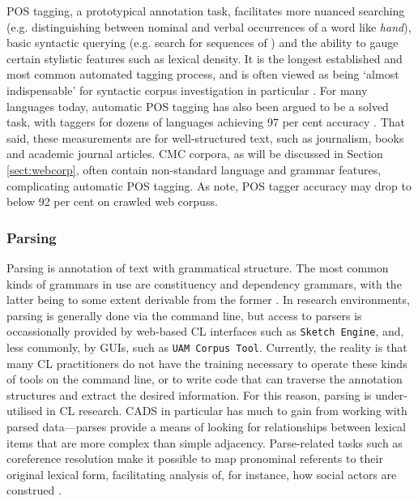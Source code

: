 \gls{POS} tagging, a prototypical annotation task, facilitates more nuanced searching (e.g. distinguishing between nominal and verbal occurrences of a word like \emph{hand}), basic syntactic querying (e.g. search for sequences of ) and the ability to gauge certain stylistic features such as lexical density. It is the longest established and most common automated tagging process, and is often viewed as being `almost indispensable' for syntactic \gls{corpus} investigation in particular \cite[p.~23]{giesbrecht_is_2009}. For many languages today, automatic \gls{POS} tagging has also been argued to be a solved task, with taggers for dozens of languages achieving 97 per cent accuracy \cite{giesbrecht_is_2009}. That said, these measurements are for well\hyp{}structured text, such as journalism, books and academic journal articles. \gls{CMC} corpora, as will be discussed in Section \ref{sect:webcorp}, often contain non-standard language and grammar features, complicating automatic \gls{POS} tagging. As \textcite{giesbrecht_is_2009} note, \gls{POS} tagger accuracy may drop to below 92 per cent on crawled web \glspl{corpus}.

\subsubsection{Parsing}

Parsing is annotation of text with grammatical structure. The most common kinds of grammars in use are constituency and dependency grammars, with the latter being to some extent derivable from the former \cite{de2006generating}. In research environments, parsing is generally done via the command line, but access to parsers is occassionally provided by web\hyp{}based \gls{CL} interfaces such as \texttt{Sketch Engine}, and, less commonly, by \glspl{GUI}, such as \texttt{UAM Corpus Tool}. Currently, the reality is that many \gls{CL} practitioners do not have the training necessary to operate these kinds of tools on the command line, or to write code that can traverse the annotation structures and extract the desired information. For this reason, parsing is under\hyp{}utilised in \gls{CL} research. \gls{CADS} in particular has much to gain from working with parsed data---parses provide a means of looking for relationships between lexical items that are more complex than simple adjacency. Parse\hyp{}related tasks such as coreference resolution make it possible to map pronominal referents to their original lexical form, facilitating analysis of, for instance, how social actors are construed \cite{feng_rst-style_2015}.

